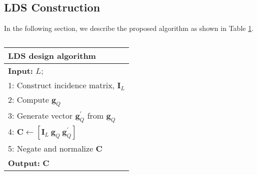 \documentclass[journal,comsoc]{IEEEtran}
\newcommand{\nid}{\noindent}
\newcommand{\argmin}{\operatornamewithlimits{argmin}}
\begin{document}
\subsection{LDS Construction}
\label{contruction}
\iffalse We propose the following procedure for constructing overloaded code matrices for LDS system. \fi
In the following section, we describe the proposed algorithm as shown in Table \ref{LDSAlgebraicDesign}. \iffalse, which is used for designing the LDS code matrix $\mathbf{C}$. We present our proposed algorithm in Table \ref{LDSAlgebraicDesign}. \fi
    \begin{table}[h]
		\vspace{-0.0cm} \caption {}%
		\centering  %
		\begin{tabular}{l}
			\hline \hline \rule{0pt}{3ex} 
			\nid \textbf{LDS design algorithm}  \\
			\hline \rule{0pt}{3ex} 
			\nid \textbf{{Input}:} $L$;  \\
			\hspace{0.1cm} 1: \hspace{0.0cm} Construct incidence matrix, $\mathbf{I}_L$ \\
			\hspace{0.1cm} 2: \hspace{0.0cm} Compute $\mathbf{g}_Q$  \\ 
			\hspace{0.1cm} 3: \hspace{0.0cm}  Generate vector $\mathbf{g}_Q^{\prime}$ from $\mathbf{g}_Q$ \\%
			\hspace{0.1cm} 4: \hspace{0.0cm} $\mathbf{C}\gets [\mathbf{I}_L \: \mathbf{g}_Q \: \mathbf{g}_Q^{\prime}]$ \\ 
			\hspace{0.1cm} 5:  \hspace{0.0cm} Negate and normalize $ \mathbf{C}$ \\
			\nid \textbf{{Output}:} $\mathbf{{C}}$ \\
			\hline
		\end{tabular}\vspace{-0.0cm}
		\label{LDSAlgebraicDesign}
	\end{table}
	
\end{document}
